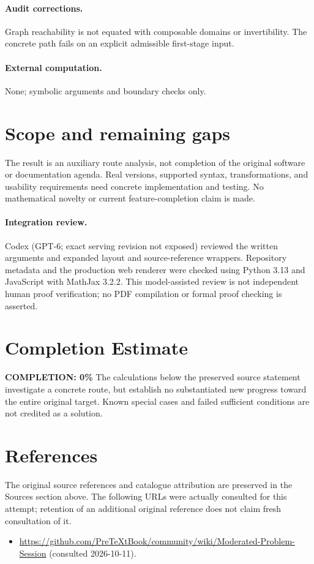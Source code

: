 \documentclass[11pt]{article}
\begin{document}
\paragraph{Audit corrections.} Graph reachability is not equated with composable domains or invertibility. The concrete path fails on an explicit admissible first-stage input.
\paragraph{External computation.} None; symbolic arguments and boundary checks only.
\section{Scope and remaining gaps}
The result is an auxiliary route analysis, not completion of the original software or documentation agenda. Real versions, supported syntax, transformations, and usability requirements need concrete implementation and testing. No mathematical novelty or current feature-completion claim is made.
\paragraph{Integration review.} Codex (GPT-6; exact serving revision not exposed) reviewed the written arguments and expanded layout and source-reference wrappers. Repository metadata and the production web renderer were checked using Python 3.13 and JavaScript with MathJax 3.2.2. This model-assisted review is not independent human proof verification; no PDF compilation or formal proof checking is asserted.

\section{Completion Estimate}
\noindent\textbf{COMPLETION: 0\%}
The calculations below the preserved source statement investigate a concrete route,
but establish no substantiated new progress toward the entire original target.
Known special cases and failed sufficient conditions are not credited as a solution.
\section{References}
The original source references and catalogue attribution are preserved in the
Sources section above. The following URLs were actually consulted for this attempt;
retention of an additional original reference does not claim fresh consultation of it.
\begin{itemize}
\item \url{https://github.com/PreTeXtBook/community/wiki/Moderated-Problem-Session} (consulted 2026-10-11). 
\end{itemize}
\end{document}

